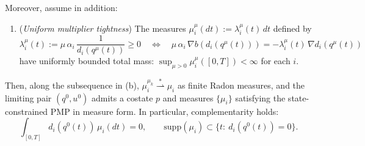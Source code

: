 \begin{proposition}
Moreover, assume in addition:
\begin{enumerate}[(H5)]
\item (\emph{Uniform multiplier tightness}) The measures $\mu_i^\mu(dt):=\lambda_i^\mu(t)\,dt$ defined by
\begin{equation}
\label{eq:lambda_def}
\lambda_i^\mu(t):=\mu\,\alpha_i\,\frac{1}{d_i(q^\mu(t))}\ge 0
\quad\Longleftrightarrow\quad
\mu\,\alpha_i\,\nabla b(d_i(q^\mu(t))) = -\lambda_i^\mu(t)\,\nabla d_i(q^\mu(t))
\end{equation}
have uniformly bounded total mass:
$\sup_{\mu>0}\mu_i^\mu([0,T])<\infty$ for each $i$.
\end{enumerate}
Then, along the subsequence in (b), $\mu_i^{\mu_k}\overset{\ast}{\rightharpoonup} \mu_i$ as finite Radon measures,
and the limiting pair $(q^0,u^0)$ admits a costate $p$ and measures $\{\mu_i\}$ satisfying the state-constrained PMP in measure form.
In particular, complementarity holds:
\begin{equation}
\label{eq:measure_complementarity_limit}
\int_{[0,T]} d_i(q^0(t))\,\mu_i(dt)=0,\qquad \mathrm{supp}(\mu_i)\subset\{t:\ d_i(q^0(t))=0\}.
\end{equation}
\end{proposition}

